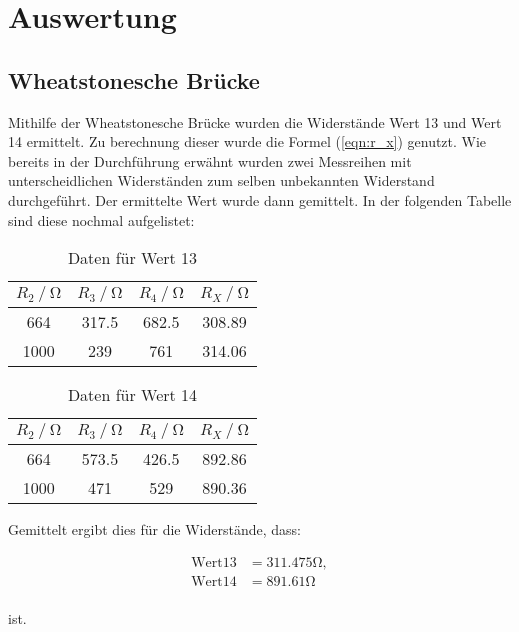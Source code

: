 \section{Auswertung}
\subsection{Wheatstonesche Brücke}
Mithilfe der Wheatstonesche Brücke wurden die Widerstände \glqq Wert 13\grqq{} und \glqq Wert 14\grqq{} ermittelt. Zu berechnung dieser wurde die Formel (\ref{eqn:r_x}) genutzt.
Wie bereits in der Durchführung erwähnt wurden zwei Messreihen mit unterscheidlichen Widerständen zum selben unbekannten Widerstand durchgeführt. Der ermittelte Wert wurde dann gemittelt. In der folgenden Tabelle sind diese 
nochmal aufgelistet:

\begin{table}
\centering
\begin{tabular}{c c c c}
\toprule
{$R_2 \mathbin{/} \si{\ohm} $} & {$R_3 \mathbin{/} \si{\ohm} $} &{$R_4 \mathbin{/} \si{\ohm} $} & {$R_X \mathbin{/} \si{\ohm} $}\\
\midrule
664  &   317.5 &  682.5 & 308.89 \\
1000 &   239   &  761   & 314.06\\
\bottomrule
\end{tabular}
\caption{Daten für Wert 13}
\label{tab:wert13}
\end{table}

\begin{table}
\centering
\begin{tabular}{c c c c}
\toprule
{$R_2 \mathbin{/} \si{\ohm} $} & {$R_3 \mathbin{/} \si{\ohm} $} &{$R_4 \mathbin{/} \si{\ohm} $} & {$R_X \mathbin{/} \si{\ohm} $}\\
\midrule
664  &   573.5 &  426.5 & 892.86   \\
1000 &   471   &  529   & 890.36   \\
\bottomrule
\end{tabular}
\caption{Daten für Wert 14}
\label{tab:wert14}
\end{table}

Gemittelt ergibt dies für die Widerstände, dass:

\begin{align*}
\text{Wert} 13 &= 311.475 \si{\ohm}, \\
\text{Wert} 14 &= 891.61 \si{\ohm} \\
\end{align*}

ist.


